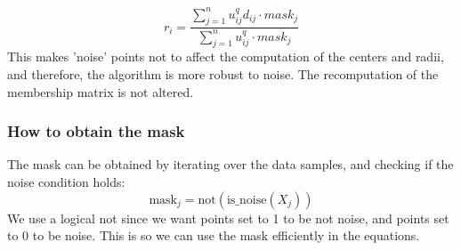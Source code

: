\documentclass[conference]{IEEEtran}
\begin{document}
\begin{equation}\label{eq:r_i_new}
    r_i = \frac{\sum_{j=1}^{n} u_{ij}^q d_{ij} \cdot mask_j}{\sum_{j=1}^{n} u_{ij}^q \cdot mask_j}
\end{equation}
This makes 'noise' points not to affect the computation of the centers and radii, and therefore, the algorithm is more robust to noise.
The recomputation of the membership matrix is not altered.

\subsubsection{How to obtain the mask}
The mask can be obtained by iterating over the data samples, and checking if the noise condition holds:
\begin{equation}
    \text{mask}_j = \text{not}(\text{is\_noise}(X_j))
\end{equation}
We use a logical not since we want points set to 1 to be not noise, and points set to 0 to be noise. This is so we can use the mask efficiently in the equations.
\end{document}
